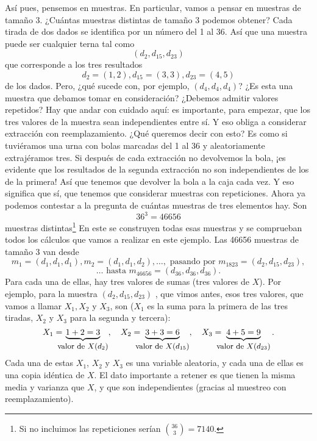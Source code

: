 \begin{itemize}
\begin{ejemplo}
        Así pues, pensemos en muestras. En particular, vamos a pensar en muestras de tamaño 3. ¿Cuántas muestras distintas de tamaño 3 podemos obtener? Cada tirada de dos dados se identifica por un número del 1 al 36. Así que una muestra puede ser cualquier terna tal como
        \[(d_2,d_{15},d_{23})\]
        que corresponde a los tres resultados
        \[d_2=(1,2), d_{15}=(3,3), d_{23}=(4,5)\]
         de los dados. Pero, ¿qué sucede con, por ejemplo, $(d_4,d_4,d_4)$? ¿Es esta una muestra que debamos tomar en consideración? ¿Debemos admitir valores repetidos? Hay que andar con cuidado aquí: es importante, para empezar, que los tres valores de la muestra sean independientes entre sí. Y eso obliga a considerar extracción con reemplazamiento. ¿Qué queremos decir con esto? Es como si tuviéramos una urna con bolas marcadas del 1 al 36 y aleatoriamente extrajéramos tres. Si después de cada extracción no devolvemos la bola, ¡es evidente que los resultados de la segunda extracción no son independientes de los de la primera! Así que tenemos que devolver la bola a la caja cada vez. Y eso significa que sí, que tenemos que considerar muestras con repeticiones. Ahora ya podemos contestar a la pregunta de cuántas muestras de tres elementos hay. Son
        \[36^3=46656\]
        muestras distintas\footnote{Si no incluimos las repeticiones serían $\binom{36}{3}=7140$.} En este  se construyen todas esas muestras y se comprueban todos los cálculos que vamos a realizar en este ejemplo. Las 46656 muestras de tamaño 3 van desde
        \[m_1=(d_1,d_1,d_1),m_2=(d_1,d_1,d_2),\ldots,\mbox{ pasando por }m_{1823}=(d_2,d_{15},d_{23}),\]\[\ldots\mbox{ hasta }m_{46656}=(d_{36},d_{36},d_{36}).\]
        Para cada una de ellas, hay tres valores de sumas (tres valores de $X$). Por ejemplo, para la muestra $(d_2,d_{15},d_{23})$ , que vimos antes, esos tres valores, que vamos a llamar $X_1, X_2$ y $X_3$,
        son ($X_1$ es la suma para la primera de las tres tiradas, $X_2$ y $X_3$ para la segunda y tercera):
        \[X_1=\hspace{-3mm}\underbrace{1+2=3}_{\mbox{\small valor de $X(d_2)$}},\quad X_2=\hspace{-3mm}\underbrace{3+3=6}_{\mbox{\small valor de $X(d_{15})$}},
        \quad X_3=\hspace{-3mm}\underbrace{4+5=9}_{\mbox{\small valor de $X(d_{23})$}}.\]
        Cada una de estas $X_1$, $X_2$ y  $X_3$ es una variable aleatoria, y cada una de ellas es una copia idéntica de $X$. El dato importante a retener es que tienen la misma media y varianza que $X$, y que son independientes (gracias al muestreo con reemplazamiento).


\end{ejemplo}
\end{itemize}
